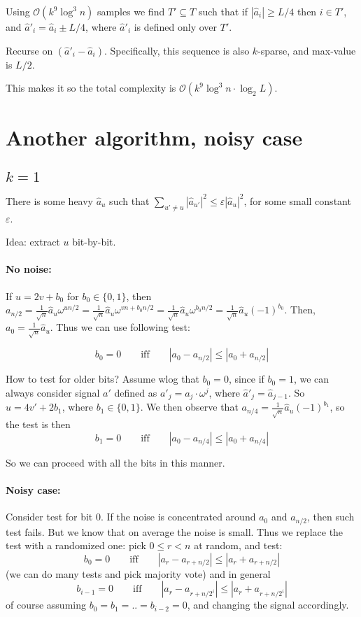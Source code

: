 \documentclass[11pt]{article}
\newcommand{\bigo}{\mathcal{O}}
\begin{document}
Using $\bigo(k^9 \log^3 n)$ samples we find $T' \subseteq T$ such that if $|\hat{a}_i| \ge L/4$ then $i \in T'$, and $\hat{a}'_i = \hat{a}_i \pm L/4$, where $\hat{a}'_i$ is defined only over $T'$.

Recurse on $(\hat{a}'_i - \hat{a}_i)$. Specifically, this sequence is also $k$-sparse, and max-value is $L/2$.

This makes it so the total complexity is $\bigo(k^9 \log^3 n \cdot \log_2 L)$. 

\section{Another algorithm, noisy case}
\subsection{$k=1$}

There is some heavy $\hat{a}_u$ such that $\sum_{u' \not = u} |\hat{a}_{u'}|^2 \le \varepsilon |\hat{a}_u|^2$, for some small constant $\varepsilon$.

Idea: extract $u$ bit-by-bit.
\paragraph{No noise:} If $u = 2v + b_0$ for $b_0 \in \{0,1\}$, then $a_{n/2} = \frac{1}{\sqrt{n}} \hat{a}_u\omega^{u n/2} =\frac{1}{\sqrt{n}}  \hat{a}_u \omega^{vn + b_0n/2} = \frac{1}{\sqrt{n}} \hat{a}_u \omega^{b_0n/2} = \frac{1}{\sqrt{n}} \hat{a}_u (-1)^{b_0}$.
Then, $a_0 = \frac{1}{\sqrt{n}} \hat{a}_u$. Thus we can use following test:

$$b_0 = 0 \quad\quad\text{iff}\quad\quad |a_0 - a_{n/2}| \le |a_0 + a_{n/2}|$$

How to test for older bits? Assume wlog that $b_0 = 0$, since if $b_0 = 1$, we can always consider signal $a'$ defined as $a'_j = a_j \cdot \omega^j$, where $\hat{a}'_j = \hat{a}_{j-1}$.
So $u = 4v' + 2b_1$, where $b_1 \in \{0,1\}$. We then observe that $a_{n/4} = \frac{1}{\sqrt{n}} \hat{a}_u (-1)^{b_1}$, so the test is then
$$b_1 = 0 \quad\quad\text{iff}\quad\quad |a_0 - a_{n/4}| \le |a_0 + a_{n/4}|$$

So we can proceed with all the bits in this manner.

\paragraph{Noisy case:}
Consider test for bit 0. If the noise is concentrated around $a_0$ and $a_{n/2}$, then such test fails. But we know that on average the noise is small. Thus we replace the test with a randomized one: pick $0 \le r < n$ at random, and test:
$$b_0 = 0 \quad\quad\text{iff}\quad\quad |a_{r} - a_{r+n/2}| \le |a_{r} + a_{r+n/2}|$$
(we can do many tests and pick majority vote)
and in general
$$b_{i-1} = 0 \quad\quad\text{iff}\quad\quad |a_r - a_{r+n/2^i}| \le |a_r + a_{r+n/2^i}|$$
of course assuming $b_0=b_1=..=b_{i-2} = 0$, and changing the signal accordingly.
\end{document}
